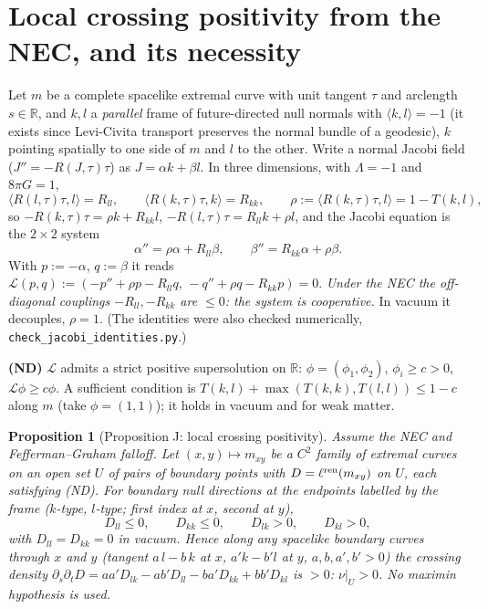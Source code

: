 \documentclass[aps,prd,onecolumn,superscriptaddress,nofootinbib,amsmath,amssymb,11pt]{revtex4-2}
\newtheorem{proposition}[theorem]{Proposition}
\theoremstyle{definition}
\newcommand{\R}{\mathbb{R}}
\begin{document}
\section{Local crossing positivity from the NEC, and its necessity}\label{sec:jacobi}

Let $m$ be a complete spacelike extremal curve with unit tangent $\tau$ and arclength $s\in\R$, and $k,l$ a \emph{parallel} frame of
future-directed null normals with $\langle k,l\rangle=-1$ (it exists since Levi-Civita transport preserves the normal bundle of a
geodesic), $k$ pointing spatially to one side of $m$ and $l$ to the other. Write a normal Jacobi field ($J''=-R(J,\tau)\tau$) as
$J=\alpha k+\beta l$. In three dimensions, with $\Lambda=-1$ and $8\pi G=1$,
\[
\langle R(l,\tau)\tau,l\rangle=R_{ll},\qquad\langle R(k,\tau)\tau,k\rangle=R_{kk},\qquad\rho:=\langle R(k,\tau)\tau,l\rangle=1-T(k,l),
\]
so $-R(k,\tau)\tau=\rho k+R_{kk}l$, $-R(l,\tau)\tau=R_{ll}k+\rho l$, and the Jacobi equation is the $2\times2$ system
\begin{equation}\label{eq:jacobi}
\alpha''=\rho\alpha+R_{ll}\beta,\qquad\beta''=R_{kk}\alpha+\rho\beta .
\end{equation}
With $p:=-\alpha$, $q:=\beta$ it reads $\mathcal L(p,q):=(-p''+\rho p-R_{ll}q,\,-q''+\rho q-R_{kk}p)=0$. \emph{Under the NEC the off-diagonal
couplings $-R_{ll},-R_{kk}$ are $\le0$: the system is cooperative.} In vacuum it decouples, $\rho=1$. (The identities were also checked
numerically, \texttt{check\_jacobi\_identities.py}.)

\textbf{(ND)} $\mathcal L$ admits a strict positive supersolution on $\R$: $\phi=(\phi_1,\phi_2)$, $\phi_i\ge c>0$, $\mathcal L\phi\ge c\phi$. A sufficient
condition is $T(k,l)+\max(T(k,k),T(l,l))\le1-c$ along $m$ (take $\phi=(1,1)$); it holds in vacuum and for weak matter.

\begin{proposition}[Proposition J: local crossing positivity]\label{prop:J}
Assume the NEC and Fefferman--Graham falloff. Let $(x,y)\mapsto m_{xy}$ be a $C^2$ family of extremal curves on an open set $U$ of pairs of
boundary points with $D=\ell^{\rm ren}(m_{xy})$ on $U$, each satisfying (ND). For boundary null directions at the endpoints labelled by
the frame ($k$-type, $l$-type; first index at $x$, second at $y$),
\[
D_{ll}\le0,\qquad D_{kk}\le0,\qquad D_{lk}>0,\qquad D_{kl}>0,
\]
with $D_{ll}=D_{kk}=0$ in vacuum. Hence along any spacelike boundary curves through $x$ and $y$ (tangent $a\,l-b\,k$ at $x$, $a'k-b'l$ at
$y$, $a,b,a',b'>0$) the crossing density $\partial_s\partial_tD=aa'D_{lk}-ab'D_{ll}-ba'D_{kk}+bb'D_{kl}$ is $>0$: $\nu|_U>0$. No maximin hypothesis
is used.
\end{proposition}
\end{document}
